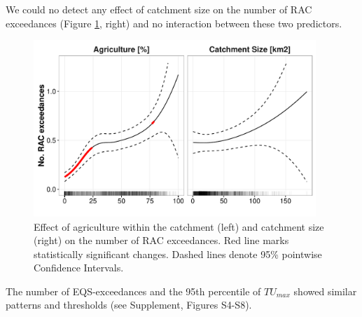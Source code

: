 \documentclass[journal=esthag,manuscript=article]{achemso}
\begin{document}
We could no detect any effect of catchment size on the number of RAC exceedances (Figure \ref{fig:fig4}, right) and no interaction between these two predictors.

\begin{figure}[ht]
  \includegraphics[width=0.95\textwidth]{figure4.pdf}
  \caption{Effect of agriculture within the catchment (left) and catchment size (right) on the number of RAC exceedances. Red line marks statistically significant changes. Dashed lines denote 95\% pointwise Confidence Intervals.
  }
  \label{fig:fig4}
\end{figure}

The number of EQS-exceedances and the 95th percentile of $TU_{max}$ showed similar patterns and thresholds (see Supplement, Figures S4-S8). 
%
%
\end{document}
